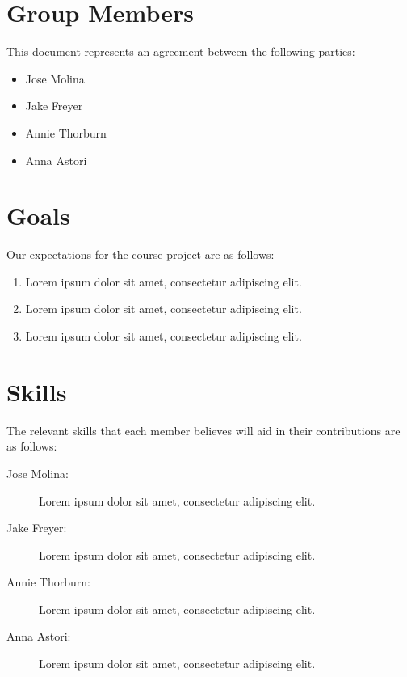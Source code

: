 \documentclass{article}
\newcommand{\groupmember}[1]{#1}
\begin{document}
\section{Group Members} %
\label{par:group_members}
This document represents an agreement between the following parties:
\begin{itemize}
    \item \groupmember{Jose Molina}
    \item \groupmember{Jake Freyer}
    \item \groupmember{Annie Thorburn}
    \item \groupmember{Anna Astori}
\end{itemize}

\section{Goals} %
\label{par:expectations}
Our expectations for the course project are as follows:
\begin{enumerate}
    \item Lorem ipsum dolor sit amet, consectetur adipiscing elit.
    \item Lorem ipsum dolor sit amet, consectetur adipiscing elit.
    \item Lorem ipsum dolor sit amet, consectetur adipiscing elit.
\end{enumerate}

\section{Skills} %
\label{sec:skills}

The relevant skills that each member believes will aid in their contributions are as follows:

\begin{description}
    \item[\groupmember{Jose Molina}:] Lorem ipsum dolor sit amet, consectetur adipiscing elit.
    \item[\groupmember{Jake Freyer}:] Lorem ipsum dolor sit amet, consectetur adipiscing elit.
    \item[\groupmember{Annie Thorburn}:] Lorem ipsum dolor sit amet, consectetur adipiscing elit.
    \item[\groupmember{Anna Astori}:] Lorem ipsum dolor sit amet, consectetur adipiscing elit.
\end{description}
\end{document}
